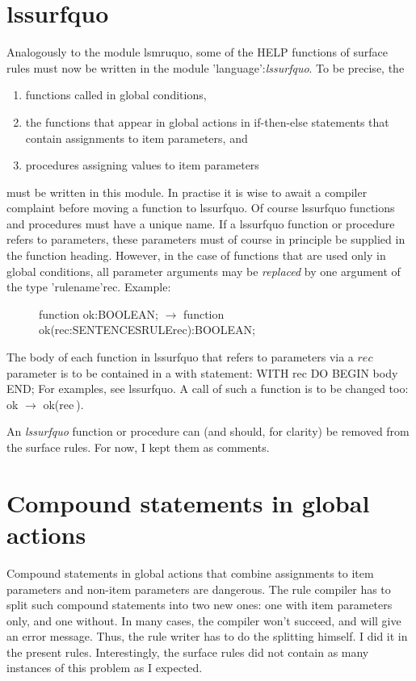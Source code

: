 \section{lssurfquo}
Analogously to the module lsmruquo, some of the HELP functions of surface rules
must now be written in the module 'language':{\em lssurfquo}. To be precise,
the
\begin{enumerate}
\item functions called in global conditions,
\item the functions that appear in global actions in if-then-else statements
      that contain assignments to item parameters, and
\item procedures assigning values to item parameters
\end{enumerate}
must be written in this module. In practise it is wise to await a
compiler complaint before moving a function to lssurfquo. Of course
lssurfquo functions and procedures must have a unique name. If a lssurfquo
function or procedure refers to parameters, these parameters must of course in
principle be supplied in the function heading. However, in the case of functions
that are used only in global conditions, all parameter arguments may be
{\em replaced} by one argument of the type 'rulename'rec. Example:
\begin{description}
\item[] function ok:BOOLEAN; $\rightarrow$ function ok(rec:SENTENCESRULErec):BOOLEAN;
\end{description}
The body of each
function in lssurfquo that refers to parameters via a $rec$ parameter is to be
contained in a with statement: WITH rec DO BEGIN body END; For examples,
see lssurfquo. A call of such a function is to be changed too: ok
$\rightarrow$ ok(rec$\hat{~}$).

An {\em lssurfquo} function or procedure can (and should, for clarity) be
removed from the surface rules. For now, I kept them as comments.
\section{Compound statements in global actions}
Compound statements in global actions that combine assignments to item
parameters and non-item parameters are dangerous. The rule compiler has to
split such compound statements into two new ones: one with item parameters
only, and one without. In many cases, the compiler won't succeed, and will give
an error message.
Thus, the rule writer has to do the splitting himself. I did it
in the present rules. Interestingly, the
surface rules did not contain as many instances of this problem as I expected.

